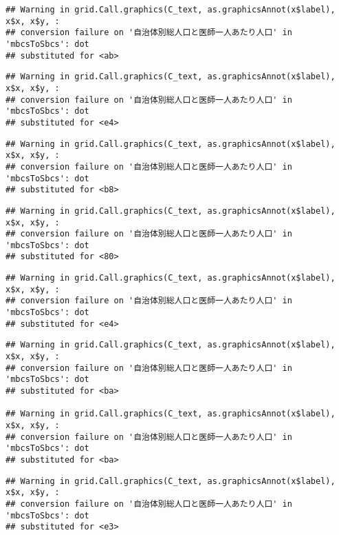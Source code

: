 \documentclass[
]{article}
\begin{document}
\begin{verbatim}
## Warning in grid.Call.graphics(C_text, as.graphicsAnnot(x$label), x$x, x$y, :
## conversion failure on '自治体別総人口と医師一人あたり人口' in 'mbcsToSbcs': dot
## substituted for <ab>
\end{verbatim}

\begin{verbatim}
## Warning in grid.Call.graphics(C_text, as.graphicsAnnot(x$label), x$x, x$y, :
## conversion failure on '自治体別総人口と医師一人あたり人口' in 'mbcsToSbcs': dot
## substituted for <e4>
\end{verbatim}

\begin{verbatim}
## Warning in grid.Call.graphics(C_text, as.graphicsAnnot(x$label), x$x, x$y, :
## conversion failure on '自治体別総人口と医師一人あたり人口' in 'mbcsToSbcs': dot
## substituted for <b8>
\end{verbatim}

\begin{verbatim}
## Warning in grid.Call.graphics(C_text, as.graphicsAnnot(x$label), x$x, x$y, :
## conversion failure on '自治体別総人口と医師一人あたり人口' in 'mbcsToSbcs': dot
## substituted for <80>
\end{verbatim}

\begin{verbatim}
## Warning in grid.Call.graphics(C_text, as.graphicsAnnot(x$label), x$x, x$y, :
## conversion failure on '自治体別総人口と医師一人あたり人口' in 'mbcsToSbcs': dot
## substituted for <e4>
\end{verbatim}

\begin{verbatim}
## Warning in grid.Call.graphics(C_text, as.graphicsAnnot(x$label), x$x, x$y, :
## conversion failure on '自治体別総人口と医師一人あたり人口' in 'mbcsToSbcs': dot
## substituted for <ba>

## Warning in grid.Call.graphics(C_text, as.graphicsAnnot(x$label), x$x, x$y, :
## conversion failure on '自治体別総人口と医師一人あたり人口' in 'mbcsToSbcs': dot
## substituted for <ba>
\end{verbatim}

\begin{verbatim}
## Warning in grid.Call.graphics(C_text, as.graphicsAnnot(x$label), x$x, x$y, :
## conversion failure on '自治体別総人口と医師一人あたり人口' in 'mbcsToSbcs': dot
## substituted for <e3>
\end{verbatim}
\end{document}
